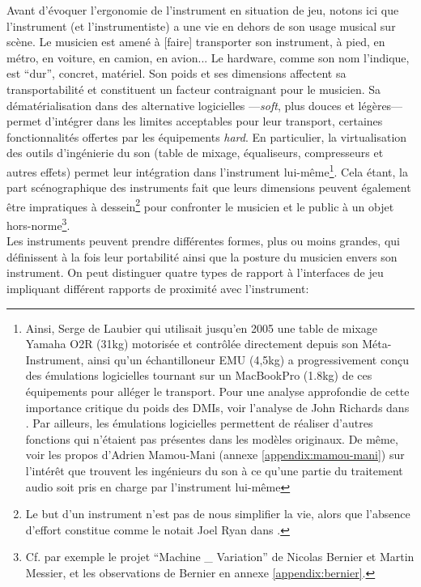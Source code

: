 \noindent Avant d'évoquer l'ergonomie de l'instrument en situation de jeu, notons ici que l'instrument (et l'instrumentiste) a une vie en dehors de son usage musical sur scène. Le musicien est amené à [faire] transporter son instrument, à pied, en métro, en voiture, en camion, en avion... Le hardware, comme son nom l'indique, est ``dur'', concret, matériel. Son poids et ses dimensions affectent sa transportabilité et constituent un facteur contraignant pour le musicien. Sa dématérialisation dans des alternative logicielles —\textit{soft}, plus douces et légères— permet d'intégrer dans les limites acceptables pour leur transport, certaines fonctionnalités offertes par les équipements \textit{hard}. En particulier, la virtualisation des outils d'ingénierie du son (table de mixage, équaliseurs, compresseurs et autres effets) permet leur intégration dans l'instrument lui-même\footnote{Ainsi, Serge de Laubier qui utilisait jusqu'en 2005 une table de mixage Yamaha O2R (31kg) motorisée et contrôlée directement depuis son Méta-Instrument, ainsi qu'un échantilloneur EMU (4,5kg) a progressivement conçu des émulations logicielles tournant sur un MacBookPro (1.8kg) de ces équipements pour alléger le transport. Pour une analyse approfondie de cette importance critique du poids des \glspl{DMI}, voir l'analyse de John Richards dans \cite{richards_32kg_2006}. Par ailleurs, les émulations logicielles permettent de réaliser d'autres fonctions qui n'étaient pas présentes dans les modèles originaux. De même, voir les propos d'Adrien Mamou-Mani (annexe \ref{appendix:mamou-mani}) sur l'intérêt que trouvent les ingénieurs du son à ce qu'une partie du traitement audio soit pris en charge par l'instrument lui-même}. Cela étant, la part scénographique des instruments fait que leurs dimensions peuvent également être impratiques à dessein\footnote{Le but d'un instrument n'est pas de nous simplifier la vie, alors que l'absence d'effort constitue  comme le notait Joel Ryan dans \cite{ryan_remarks_1991}.} pour confronter le musicien et le public à un objet hors-norme\footnote{Cf. par exemple le projet ``Machine \_ Variation'' de Nicolas Bernier et Martin Messier, et les observations de Bernier en annexe \ref{appendix:bernier}.}.\\
\indent Les instruments peuvent prendre différentes formes, plus ou moins grandes, qui définissent à la fois leur portabilité ainsi que la posture du musicien envers son instrument. On peut distinguer quatre types de rapport à l'interfaces de jeu impliquant différent rapports de proximité avec l'instrument:
